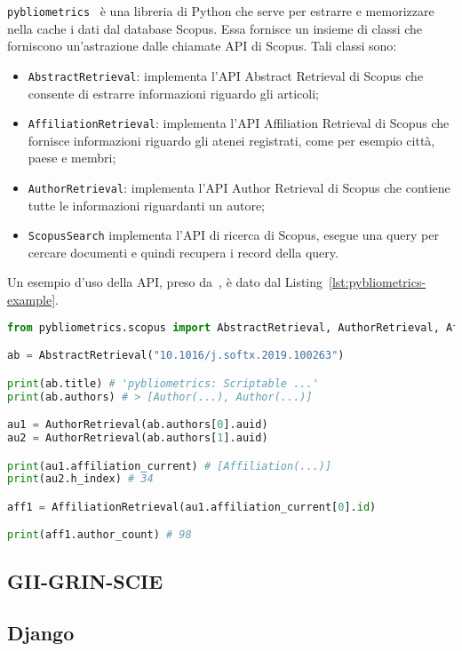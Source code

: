 \texttt{pybliometrics}~\cite{pybliometrics} è una libreria di Python che serve per estrarre e
memorizzare nella cache i dati dal database Scopus.
Essa fornisce un insieme di classi che forniscono un'astrazione dalle chiamate
API di Scopus. Tali classi sono:
\begin{itemize}
	\item \texttt{AbstractRetrieval}: implementa l'API Abstract Retrieval di
	Scopus che consente di estrarre informazioni riguardo gli articoli;
	\item \texttt{AffiliationRetrieval}: implementa l'API Affiliation Retrieval
	di Scopus che fornisce informazioni riguardo gli atenei registrati, come per
	esempio città, paese e membri;
	\item \texttt{AuthorRetrieval}: implementa l'API Author Retrieval di Scopus
	che contiene tutte le informazioni riguardanti un autore;
	\item \texttt{ScopusSearch} implementa l'API di ricerca di Scopus, esegue una
	query per cercare documenti e quindi recupera i record della query.
\end {itemize}

Un esempio d'uso della API, preso da~\cite{pybliometrics}, è dato dal
Listing~\ref{lst:pybliometrics-example}.

\begin{lstlisting}[language=Python, caption=Esempio d'uso di \texttt{pybliometrics}, label=lst:pybliometrics-example]
from pybliometrics.scopus import AbstractRetrieval, AuthorRetrieval, AffiliationRetrieval

ab = AbstractRetrieval("10.1016/j.softx.2019.100263")

print(ab.title) # 'pybliometrics: Scriptable ...'
print(ab.authors) # > [Author(...), Author(...)]

au1 = AuthorRetrieval(ab.authors[0].auid)
au2 = AuthorRetrieval(ab.authors[1].auid)

print(au1.affiliation_current) # [Affiliation(...)]
print(au2.h_index) # 34

aff1 = AffiliationRetrieval(au1.affiliation_current[0].id)

print(aff1.author_count) # 98
\end{lstlisting}

\subsection{GII-GRIN-SCIE}

\subsection{Django}\label{sec:django}

